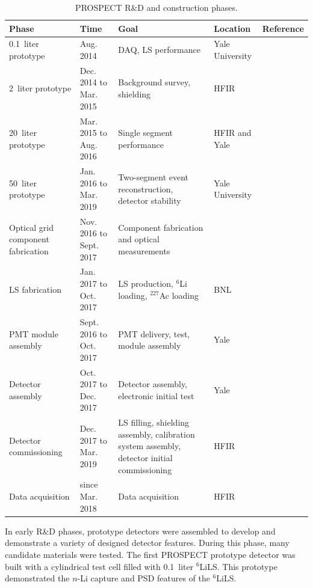\FloatBarrier
\begin{table}
    \centering
    \caption[PROSPECT R\&D and construction phases]{PROSPECT R\&D and construction phases.}
    \begin{tabular}{p{4cm}lp{8cm}ll}
         \hline
		\hline
        Phase & Time & Goal & Location & Reference \\
        \hline
        0.1~liter prototype  & Aug. 2014 & DAQ, LS performance & Yale University &\\
        2~liter prototype   & Dec. 2014 to Mar. 2015 & Background survey, shielding & HFIR &\cite{bib:prospect_background}\\
        20~liter prototype   & Mar. 2015 to Aug. 2016 & Single segment performance & HFIR and Yale & \cite{bib:P20} \\
        50~liter prototype   & Jan. 2016 to Mar. 2019 & Two-segment event reconstruction, detector stability & Yale University & \cite{bib:P50} \\
        \hline
        Optical grid component fabrication & Nov. 2016 to Sept. 2017 & Component fabrication and optical measurements  & \cite{bib:prospect_og} \\  
        LS fabrication & Jan. 2017 to Oct. 2017 & LS production, $^6$Li loading, $^{227}$Ac loading & BNL & \cite{bib:lspaper} \\
        PMT module assembly & Sept. 2016 to Oct. 2017 & PMT delivery, test, module assembly & Yale & \\
        \hline
	   	Detector assembly & Oct. 2017 to Dec. 2017 & Detector assembly, electronic initial test & Yale & \cite{bib:prospect_nim, bib:prospect_og} \\       
       	Detector commissioning & Dec. 2017 to Mar. 2019 & LS filling, shielding assembly, calibration system assembly, detector initial commissioning & HFIR & \\ 
        \hline 
        Data acquisition & since Mar. 2018 & Data acquisition & HFIR & \cite{bib:P50} \\ 
        \hline
    \end{tabular}
        \label{tab:Prototypes}
\end{table}
\FloatBarrier



In early R\&D phases, prototype detectors were assembled to develop and demonstrate a variety of designed detector features.
During this phase, many candidate materials were tested. 
The first PROSPECT prototype detector was built with a cylindrical test cell filled with 0.1~liter $^6$LiLS.
This prototype demonstrated the $n$-Li capture and PSD features of the $^6$LiLS.

